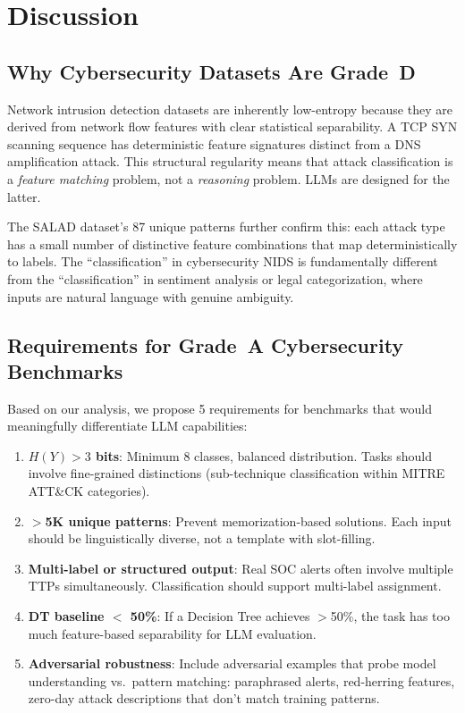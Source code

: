 \documentclass[journal]{IEEEtran}
\begin{document}
\section{Discussion}

\subsection{Why Cybersecurity Datasets Are Grade~D}
Network intrusion detection datasets are inherently low-entropy because they are derived from network flow features with clear statistical separability. A TCP SYN scanning sequence has deterministic feature signatures distinct from a DNS amplification attack. This structural regularity means that attack classification is a \emph{feature matching} problem, not a \emph{reasoning} problem. LLMs are designed for the latter.

The SALAD dataset's 87 unique patterns further confirm this: each attack type has a small number of distinctive feature combinations that map deterministically to labels. The ``classification'' in cybersecurity NIDS is fundamentally different from the ``classification'' in sentiment analysis or legal categorization, where inputs are natural language with genuine ambiguity.

\subsection{Requirements for Grade~A Cybersecurity Benchmarks}
Based on our analysis, we propose 5 requirements for benchmarks that would meaningfully differentiate LLM capabilities:

\begin{enumerate}
\item \textbf{$H(Y) > 3$ bits}: Minimum 8 classes, balanced distribution. Tasks should involve fine-grained distinctions (sub-technique classification within MITRE ATT\&CK categories).
\item \textbf{$>$5K unique patterns}: Prevent memorization-based solutions. Each input should be linguistically diverse, not a template with slot-filling.
\item \textbf{Multi-label or structured output}: Real SOC alerts often involve multiple TTPs simultaneously. Classification should support multi-label assignment.
\item \textbf{DT baseline $<$ 50\%}: If a Decision Tree achieves $>$50\%, the task has too much feature-based separability for LLM evaluation.
\item \textbf{Adversarial robustness}: Include adversarial examples that probe model understanding vs.\ pattern matching: paraphrased alerts, red-herring features, zero-day attack descriptions that don't match training patterns.
\end{enumerate}
\end{document}
